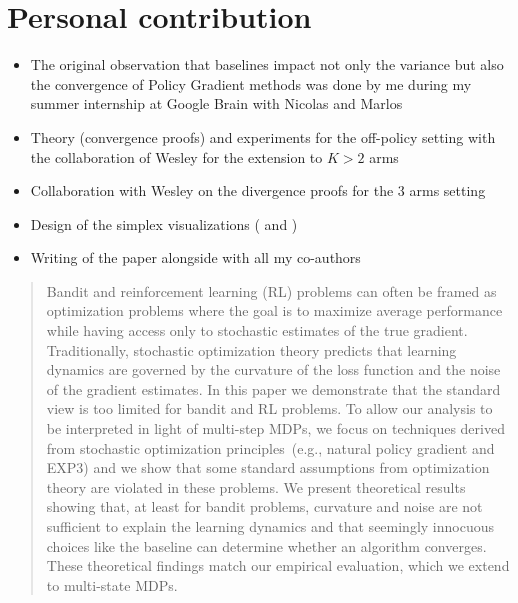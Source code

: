 \section*{Personal contribution}
\begin{itemize}
    \item The original observation that baselines impact not only the variance but also the convergence of Policy Gradient methods was done by me during my summer internship at Google Brain with Nicolas and Marlos
    \item Theory (convergence proofs) and experiments for the off-policy setting with the collaboration of Wesley for the extension to $K > 2$ arms
    \item Collaboration with Wesley on the divergence proofs for the 3 arms setting
    \item Design of the simplex visualizations ( and )
    \item Writing of the paper alongside with all my co-authors
\end{itemize}



\begin{abstract}


Bandit and reinforcement learning (RL) problems can often be framed as optimization problems where the goal is to maximize average performance while having access only to stochastic estimates of the true gradient. Traditionally, stochastic optimization theory predicts that learning dynamics are governed by the curvature of the loss function and the noise of the gradient estimates. In this paper we demonstrate that the standard view is too limited for bandit and RL problems. To allow our analysis to be interpreted in light of multi-step MDPs, we focus on techniques derived from stochastic optimization principles~(e.g., natural policy gradient and EXP3) and we show that some standard assumptions from optimization theory are violated in these problems. We present theoretical results showing that, at least for bandit problems, curvature and noise are not sufficient to explain the learning dynamics and that seemingly innocuous choices like the baseline can determine whether an algorithm converges. These theoretical findings match our empirical evaluation, which we extend to multi-state MDPs.
\end{abstract}

